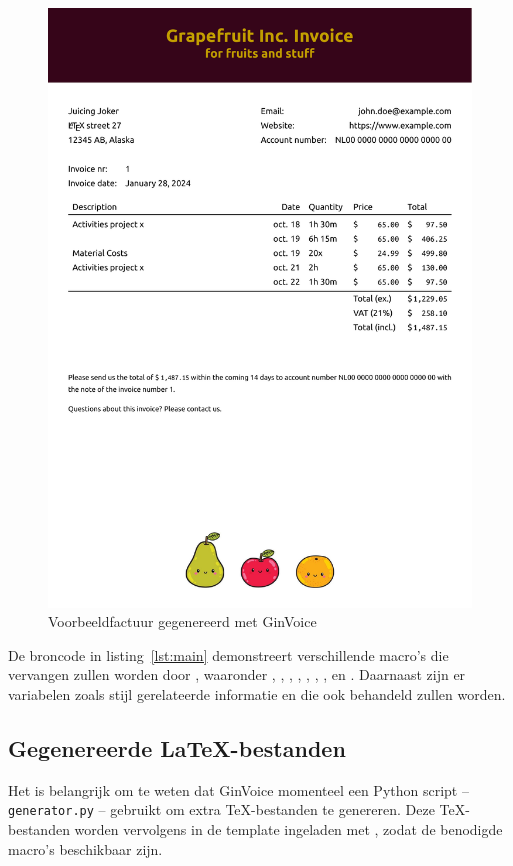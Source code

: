 \begin{figure}[!h]
    \centering
    \includegraphics[width=.91\linewidth]{ginvoice/ginvoice.pdf}
    \caption{Voorbeeldfactuur gegenereerd met GinVoice\vadjust{\vspace*{-11pt}}}
    \label{fig:voorbeeldfactuur}
\end{figure}

De broncode in listing~\ref{lst:main} demonstreert verschillende macro's die vervangen zullen worden door , waaronder , , , , , , ,  en .
Daarnaast zijn er variabelen zoals stijl gerelateerde informatie en  die ook behandeld zullen worden.

\subsection{Gegenereerde \LaTeX-bestanden}
Het is belangrijk om te weten dat GinVoice\cite{ginvoice} momenteel een Python script -- \texttt{generator.py} -- gebruikt om extra \TeX-bestanden te genereren.
Deze \TeX-bestanden worden vervolgens in de template ingeladen met , zodat de benodigde macro's beschikbaar zijn.

